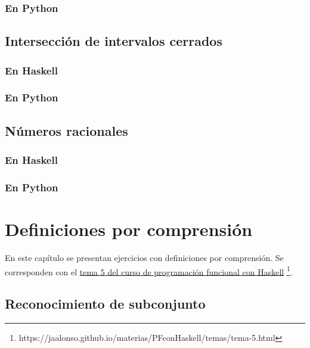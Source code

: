 \documentclass[a4paper,12pt,twoside]{book}
\begin{document}
\subsection*{En Python}

\section{Intersección de intervalos cerrados}
\subsection*{En Haskell}
\subsection*{En Python}

\section{Números racionales}
\subsection*{En Haskell}
\subsection*{En Python}

\chapter{Definiciones por comprensión}

En este capítulo se presentan ejercicios con definiciones por
comprensión. Se corresponden con el
\href{https://jaalonso.github.io/materias/PFconHaskell/temas/tema-5.html}
{tema 5 del curso de programación funcional con Haskell}
\footnote{https://jaalonso.github.io/materias/PFconHaskell/temas/tema-5.html}.

\minitoc

\section{Reconocimiento de subconjunto}
\end{document}
